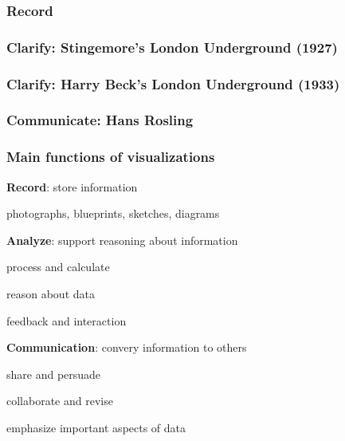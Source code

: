 \documentclass[12pt]{beamer}\usepackage[]{graphicx}\usepackage[]{color}
\begin{document}

\begin{frame}
\frametitle{Record}
\begin{center}

\small{ }
\end{center}
\end{frame}


\begin{frame}
\frametitle{Clarify: Stingemore's London Underground (1927)}
\begin{center}
\end{center}
\end{frame}


\begin{frame}
\frametitle{Clarify: Harry Beck's London Underground (1933)}
\begin{center}
\end{center}
\end{frame}


\begin{frame}
\frametitle{Communicate: Hans Rosling}
\begin{center}
\end{center}
\end{frame}


\begin{frame}
\frametitle{Main functions of visualizations}

\bi
  \item \textbf{Record}: store information
  \bi
    \item photographs, blueprints, sketches, diagrams
  \ei
  \item \textbf{Analyze}: support reasoning about information
  \bi
    \item process and calculate
    \item reason about data
    \item feedback and interaction
  \ei
  \item \textbf{Communication}: convery information to others
  \bi
    \item share and persuade
    \item collaborate and revise
    \item emphasize important aspects of data
  \ei
\ei

{}

\end{frame}
\end{document}
